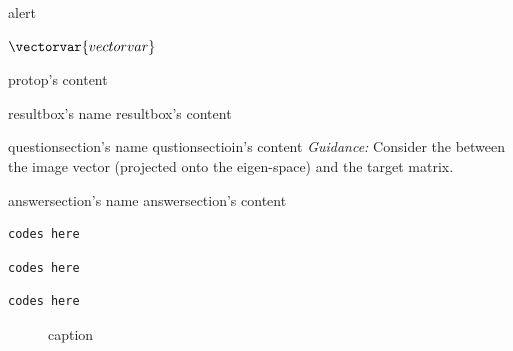 





\alert{alert}


$\vectorvar{vectorvar}$

\begin{protop}
    protop's content
\end{protop}


\begin{resultbox}{resultbox's name}
    resultbox's content
\end{resultbox}

\begin{questionsection}{questionsection's name}
    qustionsectioin's content
\textit{Guidance:} Consider the  between the image vector (projected onto the eigen-space) and the target matrix.
\end{questionsection}

\begin{answersection}{answersection's name}
    answersection's content
\end{answersection}


\begin{lstlisting}[style=pythonstyle_bright_2026, caption={caption's text}]
    codes here
\end{lstlisting}

\begin{lstlisting}[style=pythonstyle_dark_2026, caption={caption's text}]
    codes here
\end{lstlisting}

\begin{lstlisting}[style=pythonstyle, caption={caption's text}]
    codes here
\end{lstlisting}

% 



\begin{figure}[H]
    \centering
    \caption{caption}\label{fig:file_name}
\end{figure}

